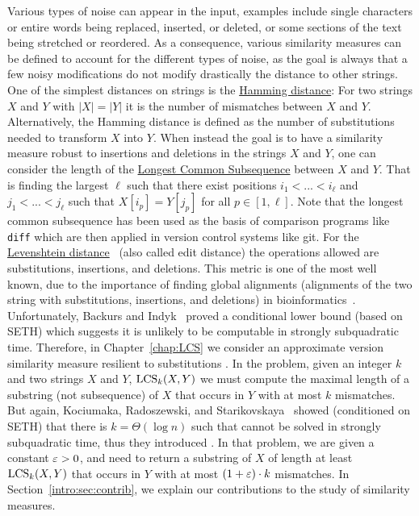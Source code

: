 Various types of noise can appear in the input, examples include single characters or entire words being replaced, inserted, or deleted, or some sections of the text being stretched or reordered. As a consequence, various similarity measures can be defined to account for the different types of noise, as the goal is always that a few noisy modifications do not modify drastically the distance to other strings.
One of the simplest distances on strings is the \underline{Hamming distance}: For two strings $X$ and $Y$ with $|X|=|Y|$ it is the number of mismatches between $X$ and $Y$. Alternatively, the Hamming distance is defined as the number of substitutions needed to transform $X$ into $Y$.
When instead the goal is to have a similarity measure robust to insertions and deletions in the strings $X$ and $Y$, one can consider the length of the \underline{Longest Common Subsequence} between $X$ and $Y$. That is finding the largest $\ell$ such that there exist positions $i_1<... < i_\ell$ and $j_1< ... < j_\ell$ such that $X[i_p] = Y[j_p]$ for all $p \in [1,\ell]$. Note that the longest common subsequence has been used as the basis of comparison programs like \texttt{diff} which are then applied in version control systems like git.
For the \underline{Levenshtein distance}~\cite{levenshtein1966binary} (also called edit distance) the operations allowed are substitutions, insertions, and deletions. This metric is one of the most well known, due to the importance of finding global alignments (alignments of the two string with substitutions, insertions, and deletions) in bioinformatics~\cite{Gusfield1997}.
Unfortunately, Backurs and Indyk~\cite{DBLP:conf/stoc/BackursI15} proved a conditional lower bound (based on SETH) which suggests it is unlikely to be computable in strongly subquadratic time.
Therefore, in Chapter~\ref{chap:LCS} we consider \kApproxLCS an approximate version similarity measure resilient to substitutions \kLCS. In the \kLCS problem, given an integer $k$ and two strings $X$ and $Y$, $\mathrm{LCS}_{k}(X,Y)$ we must compute the maximal length of a substring (not subsequence) of $X$ that occurs in $Y$ with at most $k$ mismatches. 
But again, Kociumaka, Radoszewski, and Starikovskaya~\cite{DBLP:journals/algorithmica/KociumakaRS19} showed (conditioned on SETH) that there is $k=\Theta(\log n)$ such that \kLCS cannot be solved in strongly subquadratic time, thus they introduced \kApproxLCS . In that problem, we are given a constant $\varepsilon > 0$, and need to return a substring of $X$ of length at least $\mathrm{LCS}_{k}(X,Y)$ that occurs in $Y$ with at most $(1+\varepsilon) \cdot k$ mismatches.
In Section~\ref{intro:sec:contrib}, we explain our contributions to the study of similarity measures.

